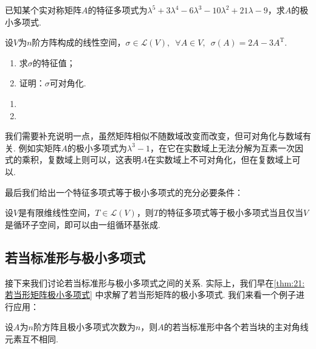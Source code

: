 \begin{example}
    已知某个实对称矩阵$A$的特征多项式为$\lambda^5+3\lambda^4-6\lambda^3-10\lambda^2+21\lambda-9$，求$A$的极小多项式.
\end{example}

\begin{solution}

\end{solution}

\begin{example}
    设$V$为$n$阶方阵构成的线性空间，$\sigma\in \mathcal{L}(V),\enspace \forall A\in V,\enspace \sigma(A)=2A-3A^{\mathrm{T}}$.
    \begin{enumerate}
        \item 求$\sigma$的特征值；

        \item 证明：$\sigma$可对角化.
    \end{enumerate}
\end{example}

\begin{solution}
    \begin{enumerate}
        \item

        \item
    \end{enumerate}
\end{solution}

我们需要补充说明一点，虽然矩阵相似不随数域改变而改变，但可对角化与数域有关. 例如实矩阵$A$的极小多项式为$\lambda^3-1$，在它在实数域上无法分解为互素一次因式的乘积，复数域上则可以，这表明$A$在实数域上不可对角化，但在复数域上可以.

最后我们给出一个特征多项式等于极小多项式的充分必要条件：
\begin{theorem}
    设$V$是有限维线性空间，$T\in \mathcal{L}(V)$，则$T$的特征多项式等于极小多项式当且仅当$V$是循环子空间，即可以由一组循环基张成.
\end{theorem}

\subsection{若当标准形与极小多项式}
接下来我们讨论若当标准形与极小多项式之间的关系. 实际上，我们早在\autoref{thm:21:若当形矩阵极小多项式} 中求解了若当形矩阵的极小多项式. 我们来看一个例子进行应用：
\begin{example}
    设$A$为$n$阶方阵且极小多项式次数为$n$，则$A$的若当标准形中各个若当块的主对角线元素互不相同.
\end{example}

